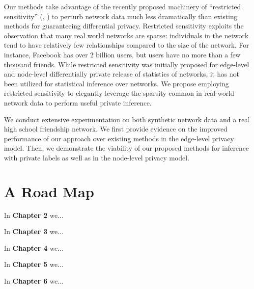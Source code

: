 Our methods take advantage of the recently proposed machinery of ``restricted sensitivity'' (\cite{BBDS13}, \cite{KNRS13}) to perturb network data much less dramatically than existing methods for guaranteeing differential privacy. Restricted sensitivity exploits the observation that many real world networks are sparse: individuals in the network tend to have relatively few relationships compared to the size of the network. For instance, Facebook has over 2 billion users, but users have no more than a few thousand friends. While restricted sensitivity was initially proposed for edge-level and node-level differentially private release of statistics of networks, it has not been utilized for statistical inference over networks. We propose employing restricted sensitivity to elegantly leverage the sparsity common in real-world network data to perform useful private inference. 

We conduct extensive experimentation on both synthetic network data and a real high school friendship network. We first provide evidence on the improved performance of our approach over existing methods in the edge-level privacy model. Then, we demonstrate the viability of our proposed methods for inference with private labels as well as in the node-level privacy model.
 
\section{A Road Map}

In \textbf{Chapter 2} we...

In \textbf{Chapter 3} we...

In \textbf{Chapter 4} we...

In \textbf{Chapter 5} we...

In \textbf{Chapter 6} we...